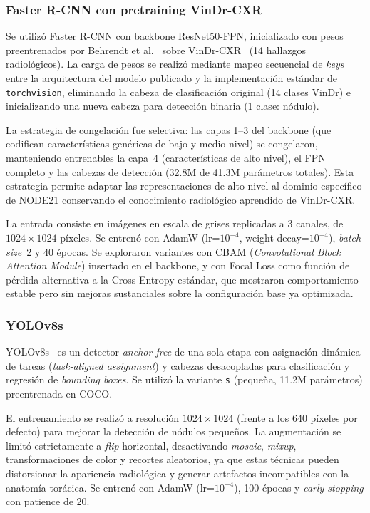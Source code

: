 \documentclass[conference]{IEEEtran}
\begin{document}
\subsubsection{Faster R-CNN con pretraining VinDr-CXR}

Se utiliz\'{o} Faster R-CNN con backbone ResNet50-FPN, inicializado con pesos
preentrenados por Behrendt et al.~\cite{behrendt2023node21} sobre
VinDr-CXR~\cite{vindrcxr} (14 hallazgos radiol\'{o}gicos). La carga de pesos
se realiz\'{o} mediante mapeo secuencial de \textit{keys} entre la
arquitectura del modelo publicado y la implementaci\'{o}n est\'{a}ndar de
\texttt{torchvision}, eliminando la cabeza de clasificaci\'{o}n original (14
clases VinDr) e inicializando una nueva cabeza para detecci\'{o}n binaria (1
clase: n\'{o}dulo).

La estrategia de congelaci\'{o}n fue selectiva: las capas 1--3 del backbone
(que codifican caracter\'{i}sticas gen\'{e}ricas de bajo y medio nivel) se
congelaron, manteniendo entrenables la capa~4 (caracter\'{i}sticas de alto
nivel), el FPN completo y las cabezas de detecci\'{o}n (32.8M de 41.3M
par\'{a}metros totales). Esta estrategia permite adaptar las
representaciones de alto nivel al dominio espec\'{i}fico de NODE21
conservando el conocimiento radiol\'{o}gico aprendido de VinDr-CXR.

La entrada consiste en im\'{a}genes en escala de grises replicadas a 3 canales,
de $1024 \times 1024$ p\'{i}xeles. Se entren\'{o} con AdamW (lr=$10^{-4}$,
weight decay=$10^{-4}$), \textit{batch size}~2 y 40 \'{e}pocas. Se exploraron
variantes con CBAM (\textit{Convolutional Block Attention Module}) insertado en
el backbone, y con Focal Loss como funci\'{o}n de p\'{e}rdida alternativa a la
Cross-Entropy est\'{a}ndar, que mostraron comportamiento estable pero sin
mejoras sustanciales sobre la configuraci\'{o}n base ya optimizada.

\subsubsection{YOLOv8s}

YOLOv8s~\cite{jocher2023} es un detector \textit{anchor-free} de una sola
etapa con asignaci\'{o}n din\'{a}mica de tareas (\textit{task-aligned
assignment}) y cabezas desacopladas para clasificaci\'{o}n y regresi\'{o}n de
\textit{bounding boxes}. Se utiliz\'{o} la variante \texttt{s} (peque\~{n}a,
11.2M par\'{a}metros) preentrenada en COCO.

El entrenamiento se realiz\'{o} a resoluci\'{o}n $1024 \times 1024$ (frente a
los 640 p\'{i}xeles por defecto) para mejorar la detecci\'{o}n de
n\'{o}dulos peque\~{n}os. La augmentaci\'{o}n se limit\'{o} estrictamente a
\textit{flip} horizontal, desactivando \textit{mosaic}, \textit{mixup},
transformaciones de color y recortes aleatorios, ya que estas t\'{e}cnicas
pueden distorsionar la apariencia radiol\'{o}gica y generar artefactos
incompatibles con la anatom\'{i}a tor\'{a}cica. Se entren\'{o} con AdamW
(lr=$10^{-4}$), 100 \'{e}pocas y \textit{early stopping} con patience de 20.
\end{document}
